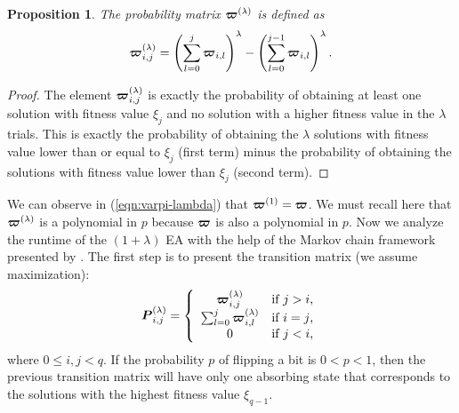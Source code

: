 \documentclass{article}
\newtheorem{proposition}{Proposition}
\def\vec#1{\mathchoice{\mbox{\boldmath$\displaystyle#1$}}
  {\mbox{\boldmath$\textstyle#1$}}
  {\mbox{\boldmath$\scriptstyle#1$}}
  {\mbox{\boldmath$\scriptscriptstyle#1$}}}
\begin{document}
\begin{proposition}
The probability matrix $\vec{\varpi}^{(\lambda)}$ is defined as
\begin{equation}
\label{eqn:varpi-lambda}
\vec{\varpi}^{(\lambda)}_{i,j} = \left(\sum_{l=0}^j \vec{\varpi}_{i,l} \right)^\lambda  - \left(\sum_{l=0}^{j-1} \vec{\varpi}_{i,l}\right)^\lambda .
\end{equation}
\end{proposition}
\begin{proof}
The element $\vec{\varpi}^{(\lambda)}_{i,j}$ is exactly the probability of obtaining at least one solution with fitness value $\xi_j$ and no solution with a higher fitness value in the $\lambda$ trials. This is exactly the probability of obtaining the $\lambda$ solutions with fitness value lower than or equal to $\xi_j$ (first term) minus the probability of obtaining the solutions with fitness value lower than $\xi_{j}$ (second term).
\end{proof}

We can observe in (\ref{eqn:varpi-lambda}) that $\vec{\varpi}^{(1)}=\vec{\varpi}$. We must recall here that $\vec{\varpi}^{(\lambda)}$ is a polynomial in $p$ because $\vec{\varpi}$ is also a polynomial in $p$. Now we analyze the runtime of the $(1+\lambda)$ EA with the help of the Markov chain framework presented by \cite{He:Yao2003}. The first step is to present the transition matrix (we assume maximization):
\begin{equation}
\label{eqn:transition-matrix}
\vec{P}^{(\lambda)}_{i,j} = \left\{\begin{array}{cc}
\vec{\varpi}^{(\lambda)}_{i,j} & \text{if $j > i$,} \\
\sum_{l=0}^{j} \vec{\varpi}^{(\lambda)}_{i,l} & \text{if $i = j$,}\\
0 & \text{if $j < i$,}
\end{array}\right.
\end{equation}
where $0 \leq i,j < q$. If the probability $p$ of flipping a bit is $0 < p < 1$, then the previous transition matrix will have only one absorbing state that corresponds to the solutions with the highest fitness value $\xi_{q-1}$.
\end{document}
